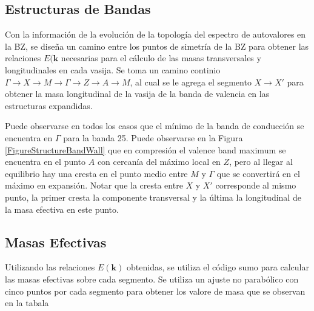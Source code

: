 \subsection{Estructuras de Bandas}

Con la información de la evolución de la topología del espectro de autovalores en 
la BZ, se diseña un camino entre los puntos de simetría de la BZ para obtener las 
relaciones  $E(\mathbf{k}$ necesarias para el cálculo de las masas transversales y
longitudinales en cada vasija. Se toma un camino continio $\Gamma \rightarrow X \rightarrow
M \rightarrow \Gamma \rightarrow Z \rightarrow A \rightarrow M$, al cual se le agrega el segmento 
$ X \rightarrow X' $ para obtener la masa longitudinal de la vasija de la banda de valencia 
en las estructuras expandidas.

Puede observarse en todos los casos que el mínimo de la banda de conducción
se encuentra en $\Gamma$ para la banda 25. 
Puede observarse en la Figura \ref{FigureStructureBandWall} que en compresión
el valence band maximum se encuentra en el punto $A$ con cercanía del máximo 
local en $Z$, pero al llegar al equilibrio hay una cresta en el punto medio entre 
$M$ y $\Gamma$  que se convertirá en el máximo en expansión. Notar que la cresta entre 
$X$ y $X'$ corresponde al mismo punto, la primer cresta la componente transversal y 
la última la longitudinal de la masa efectiva en este punto.

\subsection{Masas Efectivas}

Utilizando las relaciones $E(\mathbf{k})$ obtenidas, se utiliza el código 
sumo \cite{MGanose2018} para calcular las masas efectivas sobre 
cada segmento. Se utiliza un ajuste no parabólico con cinco puntos por cada 
segmento para obtener los valore de masa que se observan en la tabala

